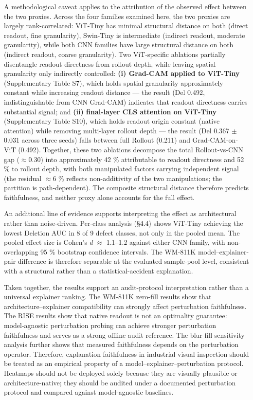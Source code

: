 \documentclass[11pt,a4paper]{article}
\begin{document}
A methodological caveat applies to the attribution of the observed effect between the two proxies. Across the four families examined here, the two proxies are largely rank-correlated: ViT-Tiny has minimal structural distance on both (direct readout, fine granularity), Swin-Tiny is intermediate (indirect readout, moderate granularity), while both CNN families have large structural distance on both (indirect readout, coarse granularity). Two ViT-specific ablations partially disentangle readout directness from rollout depth, while leaving spatial granularity only indirectly controlled: \textbf{(i) Grad-CAM applied to ViT-Tiny} (Supplementary Table S7), which holds spatial granularity approximately constant while increasing readout distance --- the result (Del 0.492, indistinguishable from CNN Grad-CAM) indicates that readout directness carries substantial signal; and \textbf{(ii) final-layer CLS attention on ViT-Tiny} (Supplementary Table S10), which holds readout origin constant (native
attention) while removing multi-layer rollout depth --- the result (Del 0.367 $\pm$ 0.031 across three seeds) falls between full Rollout (0.211) and Grad-CAM-on-ViT (0.492). Together, these two ablations decompose the total Rollout-vs-CNN gap ($\approx$0.30) into approximately 42 \% attributable to readout directness and 52 \% to rollout depth, with both manipulated factors carrying independent signal (the residual $\approx$6 \% reflects non-additivity of the two manipulations; the partition is path-dependent). The composite structural distance therefore predicts faithfulness, and neither proxy alone accounts for the full effect.

An additional line of evidence supports interpreting the effect as architectural rather than noise-driven. Per-class analysis (\S{}4.4) shows ViT-Tiny achieving the lowest Deletion AUC in 8 of 9 defect classes, not only in the pooled mean. The pooled effect size is Cohen's \emph{d} $\approx$ 1.1--1.2 against either CNN family, with non- overlapping 95 \% bootstrap confidence intervals. The WM-811K model--explainer-pair difference is therefore separable at the evaluated sample-pool level, consistent with a structural rather than a statistical-accident explanation.

Taken together, the results support an audit-protocol interpretation rather than a universal explainer ranking. The WM-811K zero-fill results show that architecture--explainer compatibility can strongly affect perturbation faithfulness. The RISE results show that native readout is not an optimality guarantee: model-agnostic perturbation probing can achieve stronger perturbation faithfulness and serves as a strong offline audit reference. The blur-fill sensitivity analysis further shows that measured faithfulness depends on the perturbation operator. Therefore, explanation faithfulness in industrial visual inspection should be treated as an empirical property of a model--explainer--perturbation protocol. Heatmaps should not be deployed solely because they are visually plausible or architecture-native; they should be audited under a documented perturbation protocol and compared against
model-agnostic baselines.
\end{document}
